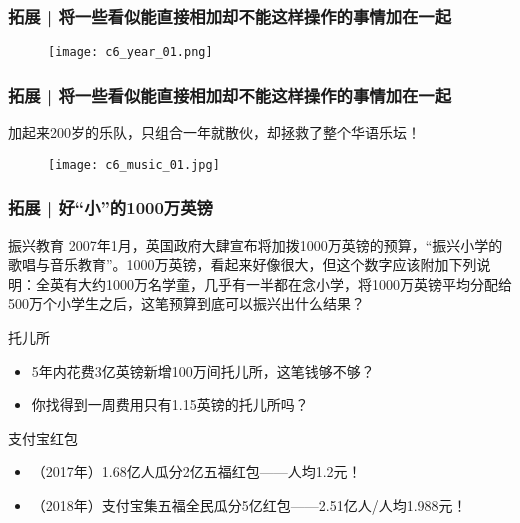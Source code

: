 \begin{frame}
  \frametitle{拓展 | 将一些看似能直接相加却不能这样操作的事情加在一起}
  \begin{figure}
    \centering
    \texttt{[image: c6\_year\_01.png]}
  \end{figure}
\end{frame}

\begin{frame}
  \frametitle{拓展 | 将一些看似能直接相加却不能这样操作的事情加在一起}
  加起来200岁的乐队，只组合一年就散伙，却拯救了整个华语乐坛！
  \vspace{-0.5em}
  \begin{figure}
    \centering
    \texttt{[image: c6\_music\_01.jpg]}
  \end{figure}
\end{frame}

\begin{frame}
  \frametitle{拓展 | 好“小”的1000万英镑}
  \begin{block}{振兴教育}
    2007年1月，英国政府大肆宣布将加拨1000万英镑的预算，“振兴小学的歌唱与音乐教育”。1000万英镑，看起来好像很大，但这个数字应该附加下列说明：全英有大约1000万名学童，几乎有一半都在念小学，将1000万英镑平均分配给500万个小学生之后，这笔预算到底可以振兴出什么结果？
  \end{block}
  \pause
  \begin{block}{托儿所}
    \begin{itemize}
      \item 5年内花费3亿英镑新增100万间托儿所，这笔钱够不够？
      \item 你找得到一周费用只有1.15英镑的托儿所吗？
    \end{itemize}
  \end{block}
  \pause
  \begin{block}{支付宝红包}
    \begin{itemize}
      \item （2017年）1.68亿人瓜分2亿五福红包——人均1.2元！
      \item （2018年）支付宝集五福全民瓜分5亿红包——2.51亿人/人均1.988元！
    \end{itemize}
  \end{block}
\end{frame}


